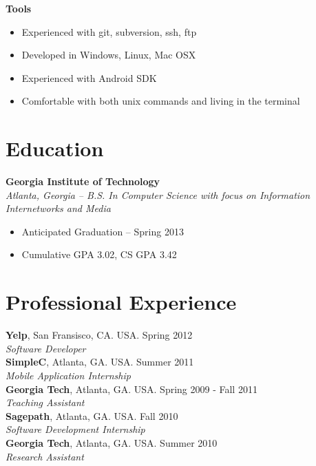 \documentclass[margin,line]{res}
\begin{document}
\begin{resume}
 {\bf Tools}
    \begin{itemize}
    \item Experienced with git, subversion, ssh, ftp
    \item Developed in Windows, Linux, Mac OSX
    \item Experienced with Android SDK
    \item Comfortable with both unix commands and living in the
      terminal
    \end{itemize}

\section{\sc Education}
    {\bf Georgia Institute of Technology}\\
    {\em Atlanta, Georgia -- B.S. In Computer Science with focus on
      Information Internetworks and Media}
    \begin{itemize}
    \item Anticipated Graduation -- Spring 2013
    \item Cumulative GPA 3.02, CS GPA 3.42
    \end{itemize}

\section{\sc Professional Experience}
    {\bf Yelp}, San Fransisco, CA. USA. \hfill{Spring 2012}\\
    {\em Software Developer}\hfill\\

    {\bf SimpleC}, Atlanta, GA. USA. \hfill{Summer 2011}\\
    {\em Mobile Application Internship} \\

    {\bf Georgia Tech}, Atlanta, GA. USA. \hfill{Spring 2009 - Fall 2011}\\
    {\em Teaching Assistant} \\

    {\bf Sagepath}, Atlanta, GA. USA. \hfill{Fall 2010}\\
    {\em Software Development Internship} \\

    {\bf Georgia Tech}, Atlanta, GA. USA. \hfill{Summer 2010}\\
    {\em Research Assistant} \\

\end{resume}
\end{document}
